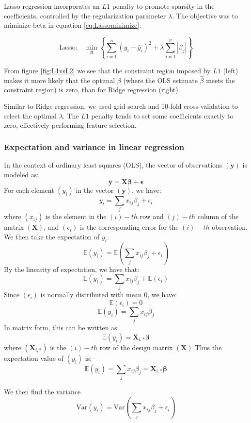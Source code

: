 Lasso regression incorporates an $L1$ penalty to promote sparsity in the coefficients, controlled by the regularization parameter $\lambda$. The objective was to miminize beta in equation \ref{eq:Lassominimize}. 

\begin{equation}
    \text{Lasso:} \quad \min_{\boldsymbol{\beta}} \left\{ \sum_{i=1}^{n} (y_i - \hat{y}_i)^2 + \lambda \sum_{j=1}^{p} |\beta_j| \right\}
    \label{eq:Lassominimize}
\end{equation}

From figure \ref{fig:L1vsL2} we see that the constraint region imposed by $L1$ (left) makes it more likely that the optimal $\beta$ (where the OLS estimate $\hat{\beta}$ meets the constraint region) is zero, than for Ridge regression (right). 

Similar to Ridge regression, we used grid search and 10-fold cross-validation to select the optimal $\lambda$. The $L1$ penalty tends to set some coefficients exactly to zero, effectively performing feature selection.

\subsubsection{Expectation and variance in linear regression}
In the context of ordinary least squares (OLS), the vector of observations $( \mathbf{y} )$ is modeled as:
$$\mathbf{y} = \mathbf{X} \boldsymbol{\beta} + \boldsymbol{\epsilon}$$
For each element $( y_i )$ in the vector $( \mathbf{y} )$, we have:
$$y_i = \sum_j x_{ij} \beta_j + \epsilon_i$$
where $( x_{ij} )$ is the element in the $( i )-th$ row and $( j )-th$ column of the matrix $( \mathbf{X} )$, and $( \epsilon_i )$ is the corresponding error for the $( i )-th$ observation.
We then take the expectation of $y_i$.
$$\mathbb{E}(y_i) = \mathbb{E}\left( \sum_j x_{ij} \beta_j + \epsilon_i \right)$$
By the linearity of expectation, we have that:
$$\mathbb{E}(y_i) = \sum_j x_{ij} \beta_j + \mathbb{E}(\epsilon_i)$$
Since $( \epsilon_i )$ is normally distributed with mean 0, we have:
$$\mathbb{E}(\epsilon_i) = 0$$
$$\mathbb{E}(y_i) = \sum_j x_{ij} \beta_j$$
In matrix form, this can be written as:
$$\mathbb{E}(y_i) = \mathbf{X}_{i,*} \boldsymbol{\beta}$$
where $( \mathbf{X}_{i,*} )$ is the $( i )-th$ row of the design matrix $( \mathbf{X} )$
Thus the expectation value of $( y_i )$ is:
$$\mathbb{E}(y_i) = \sum_j x_{ij} \beta_j = \mathbf{X}_{i,*} \boldsymbol{\beta}$$

We then find the variance
$$\text{Var}(y_i) = \text{Var}\left(\sum_j x_{ij} \beta_j + \epsilon_i\right)$$

